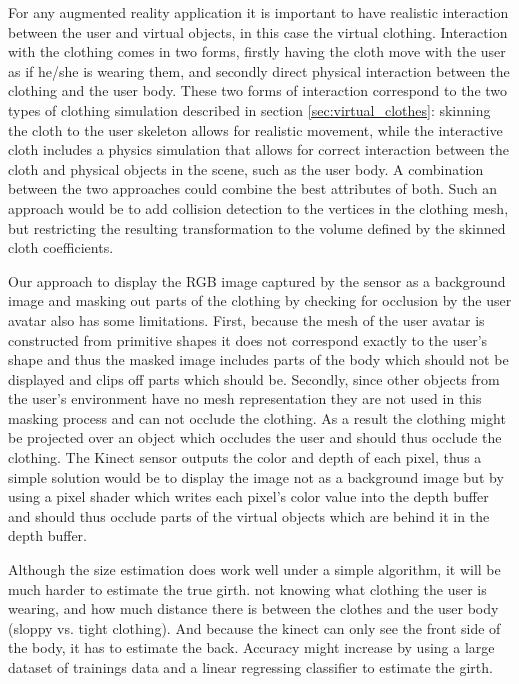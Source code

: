 \documentclass[twocolumn,a4paper]{article}
\begin{document}
For any augmented reality application it is important to have realistic interaction between the user and virtual objects, in this case the virtual clothing. Interaction with the clothing comes in two forms, firstly having the cloth move with the user as if he/she is wearing them, and secondly direct physical interaction between the clothing and the user body. These two forms of interaction correspond to the two types of clothing simulation described in section \ref{sec:virtual_clothes}: skinning the cloth to the user skeleton allows for realistic movement, while the interactive cloth includes a physics simulation that allows for correct interaction between the cloth and physical objects in the scene, such as the user body. A combination between the two approaches could combine the best attributes of both. Such an approach would be to add collision detection to the vertices in the clothing mesh, but restricting the resulting transformation to the volume defined by the skinned cloth coefficients.

Our approach to display the RGB image captured by the sensor as a background image and masking out parts of the clothing by checking for occlusion by the user avatar also has some limitations. First, because the mesh of the user avatar is constructed from primitive shapes it does not correspond exactly to the user's shape and thus the masked image includes parts of the body which should not be displayed and clips off parts which should be. Secondly, since other objects from the user's environment have no mesh representation they are not used in this masking process and can not occlude the clothing. As a result the clothing might be projected over an object which occludes the user and should thus occlude the clothing. The Kinect sensor outputs the color and depth of each pixel, thus a simple solution would be to display the image not as a background image but by using a pixel shader which writes each pixel's color value into the depth buffer and should thus occlude parts of the virtual objects which are behind it in the depth buffer.

Although the size estimation does work well under a simple algorithm, it will be much harder to estimate the true girth. not knowing what clothing the user is wearing, and how much distance there is between the clothes and the user body (sloppy vs. tight clothing). And because the kinect can only see the front side of the body, it has to estimate the back. 
Accuracy might increase by using a large dataset of trainings data and a linear regressing classifier to estimate the girth.
\end{document}
